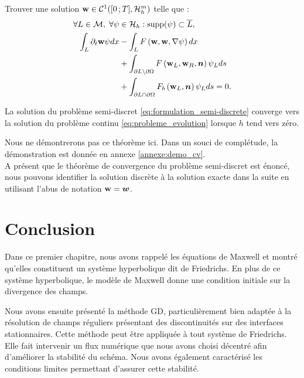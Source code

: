 Trouver une solution $\bm{\mathrm{w}} \in \mathcal{C}^1(\lbrack0\,;T\rbrack,\mathcal{H}_h^m)$ telle que :
\begin{equation}
	\begin{aligned}
		\forall L \in \mathcal{M}, \;
		\forall \psi &\in \mathcal{H}_h : \mathrm{supp}(\psi) \subset \overline{L}, \\
		\int_{L} \partial_{t} \bm{\mathrm{w}} \psi dx
		&- \int_{L} F\left(\bm{\mathrm{w}},\bm{\mathrm{w}},\nabla \psi\right) dx \\
		&+ \int_{\partial L \setminus \partial\Omega}
			F\left(\bm{\mathrm{w}}_L,\bm{\mathrm{w}}_R,\bm{n}\right) \psi_L ds \\
		&+ \int_{\partial L \cap \partial\Omega}
			F_b\left(\bm{\mathrm{w}}_L,\bm{n}\right) \psi_L ds = 0
		\label{eq:formulation_semi-discrete} .
	\end{aligned}
\end{equation}


\begin{theorem} \label{thm:convergence_pb_discret}
	La solution du problème semi-discret \eqref{eq:formulation_semi-discrete}
	converge vers la solution du problème continu \eqref{eq:probleme_evolution}
	lorsque $h$ tend vers zéro.
\end{theorem}

Nous ne démontrerons pas ce théorème ici. Dans un souci de 
complétude, la démonstration est donnée en annexe \ref{annexe:demo_cv}.
\\

A présent que le théorème de convergence du problème semi-discret est énoncé,
nous pouvons identifier la solution discrète à la solution exacte
dans la suite en utilisant l'abus de notation $\bm{\mathrm{w}} = \bm{w}$.
\\



\section*{Conclusion}

Dans ce premier chapitre, nous avons rappelé
les équations de Maxwell et montré qu’elles constituent un système
hyperbolique dit de Friedrichs.
En plus de ce système hyperbolique, le modèle de Maxwell donne
une condition initiale sur la divergence des champs.

Nous avons ensuite présenté la méthode GD, particulièrement bien adaptée
à la résolution de champs réguliers présentant
des discontinuités sur des interfaces stationnaires.
Cette méthode peut être appliquée à tout système de Friedrichs.
Elle fait intervenir un flux numérique que nous avons choisi décentré
afin d'améliorer la stabilité du schéma.
Nous avons également caractérisé les
conditions limites permettant d’assurer cette stabilité.

